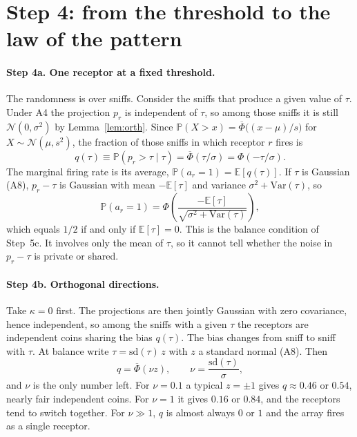 \documentclass[11pt,a4paper]{article}
\newcommand{\EE}{\mathbb{E}}
\newcommand{\PP}{\mathbb{P}}
\newcommand{\Var}{\mathrm{Var}}
\newcommand{\sd}{\mathrm{sd}}
\newcommand{\Phibar}{\overline{\Phi}}
\begin{document}
\section{Step 4: from the threshold to the law of the pattern}
\label{sec:step4}

\paragraph{Step 4a. One receptor at a fixed threshold.} The randomness is over sniffs.
Consider the sniffs that produce a given value of $\tau$. Under A4 the projection $p_r$ is
independent of $\tau$, so among those sniffs it is still $\mathcal N(0,\sigma^2)$ by
Lemma~\ref{lem:orth}. Since $\PP(X>x)=\Phibar\big((x-\mu)/s\big)$ for
$X\sim\mathcal N(\mu,s^2)$, the fraction of those sniffs in which receptor $r$ fires is
\begin{equation}
  q(\tau) \equiv \PP(p_r>\tau\mid\tau) = \Phibar(\tau/\sigma) = \Phi(-\tau/\sigma).
  \label{eq:qtau}
\end{equation}
The marginal firing rate is its average, $\PP(a_r=1)=\EE[q(\tau)]$. If $\tau$ is Gaussian
(A8), $p_r-\tau$ is Gaussian with mean $-\EE[\tau]$ and variance $\sigma^2+\Var(\tau)$, so
\begin{equation*}
  \PP(a_r=1)=\Phi\!\left(\frac{-\EE[\tau]}{\sqrt{\sigma^2+\Var(\tau)}}\right),
\end{equation*}
which equals $1/2$ if and only if $\EE[\tau]=0$. This is the balance condition of Step~5c.
It involves only the mean of $\tau$, so it cannot tell whether the noise in $p_r-\tau$
is private or shared.

\paragraph{Step 4b. Orthogonal directions.} Take $\kappa=0$ first. The projections are
then jointly Gaussian with zero covariance, hence independent, so among the sniffs with a
given $\tau$ the receptors are independent coins sharing the bias $q(\tau)$. The bias
changes from sniff to sniff with $\tau$. At balance write $\tau=\sd(\tau)\,z$ with $z$ a
standard normal (A8). Then
\begin{equation*}
  q = \Phibar(\nu z), \qquad \nu=\frac{\sd(\tau)}{\sigma},
\end{equation*}
and $\nu$ is the only number left. For $\nu=0.1$ a typical $z=\pm1$ gives $q\approx0.46$
or $0.54$, nearly fair independent coins. For $\nu=1$ it gives $0.16$ or $0.84$, and the
receptors tend to switch together. For $\nu\gg1$, $q$ is almost always $0$ or $1$ and the
array fires as a single receptor.
\end{document}
